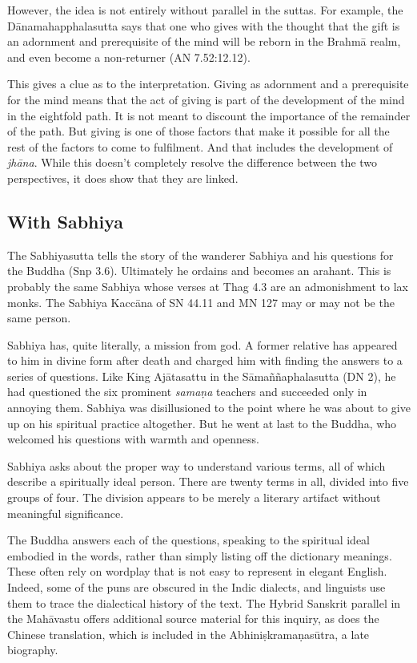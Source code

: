 \documentclass[12pt,openany]{book}%
\begin{document}
However, the idea is not entirely without parallel in the suttas. For example, the \textsanskrit{Dānamahapphalasutta} says that one who gives with the thought that the gift is an adornment and prerequisite of the mind will be reborn in the \textsanskrit{Brahmā} realm, and even become a non-returner (AN 7.52:12.12).

This gives a clue as to the interpretation. Giving as adornment and a prerequisite for the mind means that the act of giving is part of the development of the mind in the eightfold path. It is not meant to discount the importance of the remainder of the path. But giving is one of those factors that make it possible for all the rest of the factors to come to fulfilment. And that includes the development of \textit{\textsanskrit{jhāna}}. While this doesn’t completely resolve the difference between the two perspectives, it does show that they are linked.

\subsection*{With Sabhiya}

The Sabhiyasutta tells the story of the wanderer Sabhiya and his questions for the Buddha (Snp 3.6). Ultimately he ordains and becomes an arahant. This is probably the same Sabhiya whose verses at Thag 4.3 are an admonishment to lax monks. The Sabhiya \textsanskrit{Kaccāna} of SN 44.11 and MN 127 may or may not be the same person.

Sabhiya has, quite literally, a mission from god. A former relative has appeared to him in divine form after death and charged him with finding the answers to a series of questions. Like King \textsanskrit{Ajātasattu} in the \textsanskrit{Sāmaññaphalasutta} (DN 2), he had questioned the six prominent \textit{\textsanskrit{samaṇa}} teachers and succeeded only in annoying them. Sabhiya was disillusioned to the point where he was about to give up on his spiritual practice altogether. But he went at last to the Buddha, who welcomed his questions with warmth and openness.

Sabhiya asks about the proper way to understand various terms, all of which describe a spiritually ideal person. There are twenty terms in all, divided into five groups of four. The division appears to be merely a literary artifact without meaningful significance.

The Buddha answers each of the questions, speaking to the spiritual ideal embodied in the words, rather than simply listing off the dictionary meanings. These often rely on wordplay that is not easy to represent in elegant English. Indeed, some of the puns are obscured in the Indic dialects, and linguists use them to trace the dialectical history of the text. The Hybrid Sanskrit parallel in the \textsanskrit{Mahāvastu} offers additional source material for this inquiry, as does the Chinese translation, which is included in the \textsanskrit{Abhiniṣkramaṇasūtra}, a late biography.
\end{document}
